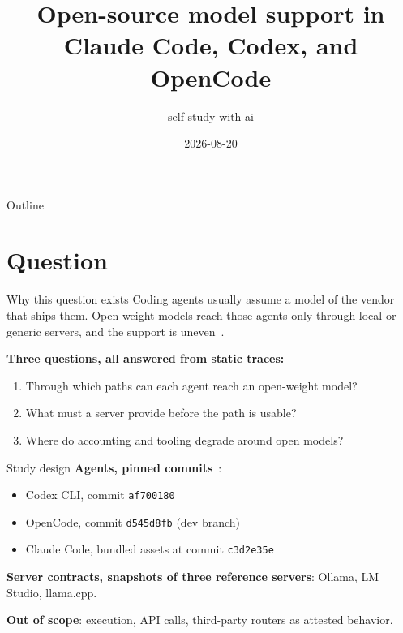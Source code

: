\documentclass[aspectratio=169,11pt]{beamer}
\title[Open-model support in coding agents]{Open-source model support in
Claude Code, Codex, and OpenCode}
\author[self-study-with-ai]{self-study-with-ai}
\date{2026-08-20}
\begin{document}
\begin{frame}
  \titlepage
\end{frame}

\begin{frame}{Outline}
  \tableofcontents
\end{frame}

\section{Question}

\begin{frame}{Why this question exists}
  Coding agents usually assume a model of the vendor that ships them.
  Open-weight models reach those agents only through local or generic
  servers, and the support is uneven~\citep{codexRepo,opencodeRepo,%
  claudeCodeSurface}.

  \vspace{0.6em}
  \textbf{Three questions, all answered from static traces:}
  \begin{enumerate}
    \item Through which paths can each agent reach an open-weight model?
    \item What must a server provide before the path is usable?
    \item Where do accounting and tooling degrade around open models?
  \end{enumerate}
\end{frame}

\begin{frame}{Study design}
  \textbf{Agents, pinned commits}~\citep{codexRepo,opencodeRepo,%
  claudeCodeSurface}:
  \begin{itemize}
    \item Codex CLI, commit \texttt{af700180}
    \item OpenCode, commit \texttt{d545d8fb} (\textsf{dev} branch)
    \item Claude Code, bundled assets at commit \texttt{c3d2e35e}
  \end{itemize}

  \vspace{0.4em}
  \textbf{Server contracts, snapshots of three reference servers}:
  Ollama, LM Studio, llama.cpp.

  \vspace{0.4em}
  \textbf{Out of scope}: execution, API calls, third-party routers as
  attested behavior.
\end{frame}
\end{document}
